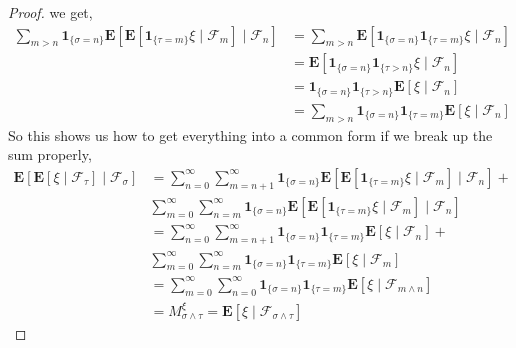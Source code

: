 \documentclass{amsbook}
\theoremstyle{definition}
\theoremstyle{remark}
\newcommand{\cexpectationlong}[2]{\textbf{E}\left[ #2 \mid #1 \right]}
\newcommand{\characteristic}[1]{\textbf{1}_{#1}}
\begin{document}
\begin{proof}
  we get,
\begin{align*}
\sum_{m>n} \characteristic{\lbrace \sigma = n \rbrace}
\cexpectationlong{\mathcal{F}_n}{\cexpectationlong{\mathcal{F}_m}{\characteristic{
    \lbrace \tau = m \rbrace } \xi}} 
&= \sum_{m>n} \cexpectationlong{\mathcal{F}_n}{\characteristic{\lbrace \sigma = n \rbrace}\characteristic{
    \lbrace \tau = m \rbrace } \xi} \\
&= \cexpectationlong{\mathcal{F}_n}{\characteristic{\lbrace \sigma = n \rbrace}\characteristic{
    \lbrace \tau > n \rbrace } \xi} \\
&=\characteristic{\lbrace \sigma = n \rbrace}\characteristic{
    \lbrace \tau > n \rbrace }  \cexpectationlong{\mathcal{F}_n}{\xi} \\
&= \sum_{m>n} \characteristic{\lbrace \sigma = n \rbrace}\characteristic{
    \lbrace \tau=m \rbrace }  \cexpectationlong{\mathcal{F}_n}{\xi} 
\end{align*}
So this shows us how to get everything into a common form if we break
up the sum properly, 
\begin{align*}
\cexpectationlong{\mathcal{F}_\sigma}{\cexpectationlong{\mathcal{F}_\tau}{\xi}} 
&= \sum_{n=0}^\infty \sum_{m=n+1}^\infty \characteristic{\lbrace \sigma = n \rbrace}
\cexpectationlong{\mathcal{F}_n}{\cexpectationlong{\mathcal{F}_m}{\characteristic{
    \lbrace \tau = m \rbrace } \xi}} + \\
&\sum_{m=0}^\infty \sum_{n=m}^\infty \characteristic{\lbrace \sigma = n \rbrace}
\cexpectationlong{\mathcal{F}_n}{\cexpectationlong{\mathcal{F}_m}{\characteristic{
    \lbrace \tau = m \rbrace } \xi}}  \\
&=\sum_{n=0}^\infty \sum_{m=n+1}^\infty \characteristic{\lbrace \sigma = n \rbrace}\characteristic{
    \lbrace \tau=m \rbrace }  \cexpectationlong{\mathcal{F}_n}{\xi} + \\
&\sum_{m=0}^\infty \sum_{n=m}^\infty \characteristic{\lbrace \sigma = n \rbrace}\characteristic{
    \lbrace \tau=m \rbrace }  \cexpectationlong{\mathcal{F}_m}{\xi}
  \\
&= \sum_{m=0}^\infty \sum_{n=0}^\infty \characteristic{\lbrace \sigma = n \rbrace}\characteristic{
    \lbrace \tau=m \rbrace }  \cexpectationlong{\mathcal{F}_{m\wedge
      n}}{\xi} \\
&= M^\xi_{\sigma \wedge \tau} = \cexpectationlong{\mathcal{F}_{\sigma
    \wedge \tau}}{\xi}
\end{align*}
\end{proof}
\end{document}
